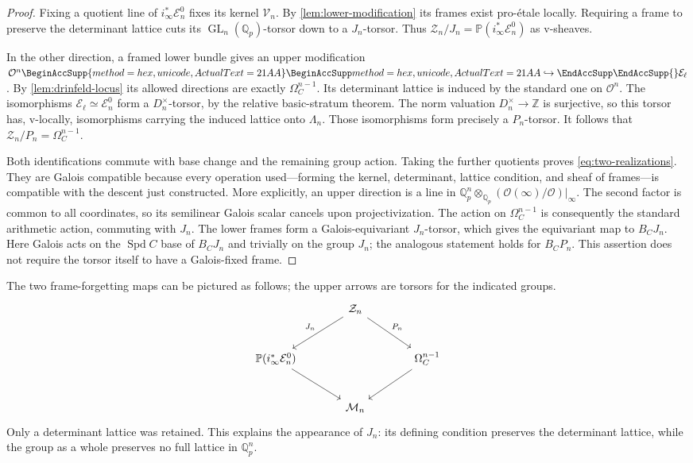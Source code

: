 \documentclass[11pt]{article}
\numberwithin{equation}{section}
\theoremstyle{definition}
\theoremstyle{remark}
\newcommand{\Q}{\mathbb Q}
\newcommand{\Z}{\mathbb Z}
\newcommand{\cO}{\mathcal O}
\DeclareMathOperator{\GL}{GL}
\DeclareMathOperator{\Spd}{Spd}
\let\UnicodeOriginalHookrightarrow\hookrightarrow
\DeclareRobustCommand{\hookrightarrow}{
  \BeginAccSupp{method=hex,unicode,ActualText=21AA}
  \UnicodeOriginalHookrightarrow\EndAccSupp{}}
\begin{document}
\begin{proof}
Fixing a quotient line of $i_\infty^*\mathcal E_n^0$ fixes its kernel
$\mathcal V_n$.  By \cref{lem:lower-modification} its frames exist
pro-\'etale locally.  Requiring a frame to preserve the determinant
lattice cuts its $\GL_n(\Q_p)$-torsor down to a $J_n$-torsor.
Thus
$\mathcal Z_n/J_n=\mathbb P(i_\infty^*\mathcal E_n^0)$
as v-sheaves.

In the other direction, a framed lower bundle gives an upper
modification $\cO^n\hookrightarrow\mathcal E_\ell$.
By \cref{lem:drinfeld-locus} its allowed directions are exactly
$\Omega_C^{n-1}$.  Its determinant lattice is induced by the standard
one on $\cO^n$.  The isomorphisms
$\mathcal E_\ell\simeq\mathcal E_n^0$ form a $D_n^\times$-torsor,
by the relative basic-stratum theorem.  The norm valuation
$D_n^\times\to\Z$ is surjective, so this torsor has, v-locally,
isomorphisms carrying the induced lattice onto $\Lambda_n$.
Those isomorphisms form precisely a $P_n$-torsor.
It follows that $\mathcal Z_n/P_n=\Omega_C^{n-1}$.

Both identifications commute with base change and the remaining group
action.  Taking the further quotients proves
\cref{eq:two-realizations}.  They are Galois compatible because every
operation used---forming the kernel, determinant, lattice condition,
and sheaf of frames---is compatible with the descent just constructed.
More explicitly, an upper direction is a line in
$\Q_p^n\otimes_{\Q_p}(\cO(\infty)/\cO)|_\infty$.
The second factor is common to all coordinates, so its semilinear
Galois scalar cancels upon projectivization.  The action on
$\Omega_C^{n-1}$ is consequently the standard arithmetic action,
commuting with $J_n$.  The lower frames form a Galois-equivariant
$J_n$-torsor, which gives the equivariant map to $B_CJ_n$.
Here Galois acts on the $\Spd C$ base of $B_CJ_n$ and trivially on
the group $J_n$; the analogous statement holds for $B_CP_n$.
This assertion does not require
the torsor itself to have a Galois-fixed frame.
\end{proof}

The two frame-forgetting maps can be pictured as follows; the upper
arrows are torsors for the indicated groups.
\[
\begin{tikzcd}[column sep=large,row sep=large]
 & \mathcal Z_n \arrow[dl,"J_n"'] \arrow[dr,"P_n"] & \\
 \mathbb P(i_\infty^*\mathcal E_n^0)
       \arrow[dr] && \Omega_C^{n-1}\arrow[dl]\\
 & \mathcal M_n &
\end{tikzcd}
\]
Only a determinant lattice was retained.  This explains the appearance
of $J_n$: its defining condition preserves the determinant lattice,
while the group as a whole preserves no full lattice in $\Q_p^n$.
\end{document}

